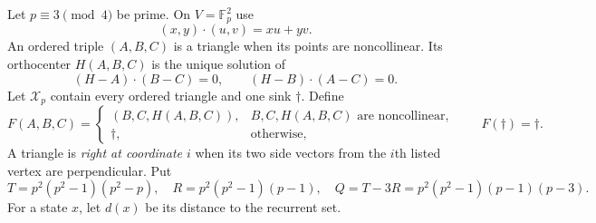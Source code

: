 \documentclass[a4paper,10pt]{amsart}
\theoremstyle{remark}
\newcommand{\Fp}{\mathbb F_p}
\newcommand{\X}{\mathcal X_p}
\begin{document}
Let $p\equiv3\pmod4$ be prime.  On $V=\Fp^2$ use
\[
 (x,y)\mathbin\cdot(u,v)=xu+yv.
\]
An ordered triple $(A,B,C)$ is a triangle when its points are noncollinear.
Its orthocenter $H(A,B,C)$ is the unique solution of
\begin{equation}\label{eq:altitudes}
 (H-A)\cdot(B-C)=0,\qquad (H-B)\cdot(A-C)=0.
\end{equation}
Let $\X$ contain every ordered triangle and one sink $\dagger$.  Define
\begin{equation}\label{eq:map}
 F(A,B,C)=
 \begin{cases}
 (B,C,H(A,B,C)),&B,C,H(A,B,C)\text{ are noncollinear},\\
 \dagger,&\text{otherwise},
 \end{cases}
 \qquad F(\dagger)=\dagger.
\end{equation}
A triangle is \emph{right at coordinate $i$} when its two side vectors from
the $i$th listed vertex are perpendicular.  Put
\begin{equation}\label{eq:counts}
 T=p^2(p^2-1)(p^2-p),\quad
 R=p^2(p^2-1)(p-1),\quad
 Q=T-3R=p^2(p^2-1)(p-1)(p-3).
\end{equation}
For a state $x$, let $d(x)$ be its distance to the recurrent set.
\end{document}
